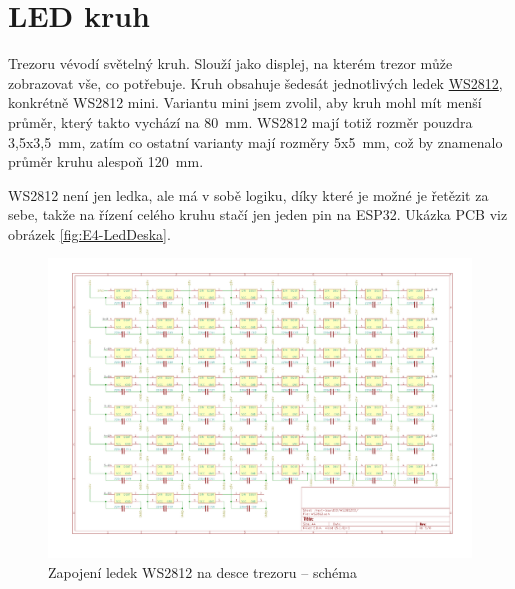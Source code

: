 \section{LED kruh}

Trezoru vévodí světelný kruh. Slouží jako displej, na kterém trezor může zobrazovat vše, co potřebuje. Kruh obsahuje šedesát jednotlivých ledek 
\href{https://cdn-shop.adafruit.com/datasheets/WS2812B.pdf}{WS2812}, konkrétně WS2812 mini. Variantu mini jsem zvolil, aby kruh mohl mít menší
průměr, který takto vychází na 80~mm. WS2812 mají totiž rozměr pouzdra 3,5x3,5~mm, zatím co ostatní varianty mají rozměry 5x5~mm, což by znamenalo průměr kruhu alespoň 120~mm.

WS2812 není jen ledka, ale má v sobě logiku, díky které je možné je řetězit za sebe, takže na řízení celého kruhu stačí jen jeden pin na ESP32.\newline
Ukázka PCB viz obrázek \ref{fig:E4-LedDeska}.
\begin{figure}[htbp]
    \centering
    \includegraphics[width=\textwidth]{kapitoly/obrazky/E4/WS2812/zapojeni_WS2812.pdf}
    \caption{Zapojení ledek WS2812 na desce trezoru -- schéma}
    \label{fig:E4-sch_civka_tercik}
\end{figure}

\newpage
